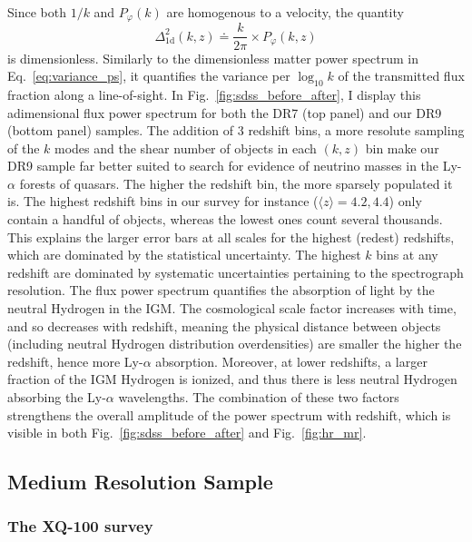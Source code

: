 Since both $1/k$ and $P_{\varphi}(k)$ are homogenous to a velocity, the quantity 
\begin{equation}
\Delta^2_{\mathrm{1d}} (k, z) \doteq \frac{k}{2 \pi} \times P_{\varphi}(k,z)
\end{equation} is dimensionless. Similarly to the dimensionless matter power spectrum in Eq.~\ref{eq:variance_ps}, it quantifies the variance per $\log_{10}k$ of the transmitted flux fraction along a line-of-sight. In Fig.~\ref{fig:sdss_before_after}, I display this adimensional flux power spectrum for both the DR7 (top panel) and our DR9 (bottom panel) samples. The addition of 3 redshift bins, a more resolute sampling of the $k$ modes and the shear number of objects in each $(k, z)$ bin make our DR9 sample far better suited to search for evidence of neutrino masses in the Ly-$\alpha$ forests of quasars. The higher the redshift bin, the more sparsely populated it is. The highest redshift bins in our survey for instance ($\langle z \rangle = 4.2, 4.4$) only contain a handful of objects, whereas the lowest ones count several thousands. This explains the larger error bars at all scales for the highest (redest) redshifts, which are dominated by the statistical uncertainty. The highest $k$ bins at any redshift are dominated by systematic uncertainties pertaining to the spectrograph resolution. The flux power spectrum quantifies the absorption of light by the neutral Hydrogen in the IGM. The cosmological scale factor increases with time, and so decreases with redshift, meaning the physical distance between objects (including neutral Hydrogen distribution overdensities) are smaller the higher the redshift, hence more Ly-$\alpha$ absorption. Moreover, at lower redshifts, a larger fraction of the IGM Hydrogen is ionized, and thus there is less neutral Hydrogen absorbing the Ly-$\alpha$ wavelengths. The combination of these two factors strengthens the overall amplitude of the power spectrum with redshift, which is visible in both Fig.~\ref{fig:sdss_before_after} and Fig.~\ref{fig:hr_mr}.


\subsection{Medium Resolution Sample}
\label{sec:mrs}

\subsubsection{The XQ-100 survey}

